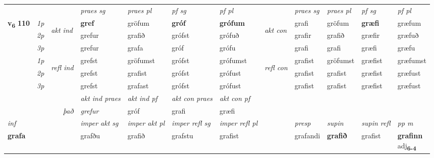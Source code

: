 \begin{longtable}[l]{X>{\footnotesize\itshape}llXXXXlXXXX}
\midrule

 & &   & \textit{praes sg}  & \textit{praes pl}    & \textit{ pf sg} & \textit{pf pl} & & \textit{praes sg}  & \textit{praes pl}    & \textit{pf sg} & \textit{pf pl }  \\ \cmidrule{4-7} \cmidrule{9-12}
 \multirow{2}{*}{{{\textbf{v{\textsubscript{6}}} \Large{\textbf{110}}}}}  & 1p & \multirow{3}{*}{\begin{turn}{90}\textit{akt ind}\end{turn}} & \textbf{gref} & gröfum & \textbf{gróf} & \textbf{grófum} & \multirow{3}{*}{\begin{turn}{90}\textit{akt con}\end{turn}} &grafi & gröfum & \textbf{græfi} & græfum\\*
 & 2p &  &  grefur  & grafið & grófst & grófuð & & grafir & grafið & græfir & græfuð \\*
 & 3p &  & grefur & grafa & gróf & grófu & & grafi & grafi& græfi & græfu \\*
\cmidrule{4-7} \cmidrule{9-12}
 & 1p & \multirow{3}{*}{\begin{turn}{90}\textit{refl ind}\end{turn}}  & grefst & gröfumst & grófst & grófumst & \multirow{3}{*}{\begin{turn}{90}\textit{refl con}\end{turn}}  &grafist & gröfumst & græfist & græfumst \\*
 & 2p &  & grefst & grafist & grófst & grófust & &grafist & grafist & græfist & græfust \\*
 & 3p  & & grefst & grafast & grófst & grófust & & grafist & grafist& græfist & græfust \\*
\cmidrule{4-7} \cmidrule{9-12}

   && &  \textit{akt ind praes} & \textit{akt ind pf} & \textit{akt con praes} & \textit{akt con pf} \\*
\multicolumn{3}{r}{\textit{það}} & grefur & gróf & grafi & græfi \\*

\cmidrule{4-7}
   {\textit{inf}} & &  & \textit{imper akt sg} & \textit{imper akt pl} & \textit{imper refl sg} & \textit{imper refl pl} && \textit{presp} & \textit{supin} & \textit{supin refl} & \textit{pp m} \\*
  {\textbf{grafa}} & && grafðu  & grafið & grafstu & grafist && grafandi &  \textbf{grafið} & grafist & \specialcell{\textbf{grafinn} \\ adj\textbf{\textsubscript{6-4}}} \\*


\end{longtable}
